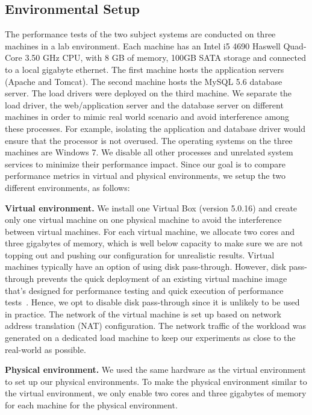 \documentclass[smallextended]{svjour3}       %
\begin{document}
\subsection{Environmental Setup}

The performance tests of the two subject systems are conducted on three machines in a lab environment. Each machine has an Intel i5 4690 Haswell Quad-Core 3.50 GHz CPU, with 8 GB of memory, 100GB SATA storage and connected to a local gigabyte ethernet. The first machine hosts the application servers (Apache and Tomcat). The second machine hosts the MySQL 5.6 database server. The load drivers were deployed on the third machine. We separate the load driver, the web/application server and the database server on different machines in order to mimic real world scenario and avoid interference among these processes. For example, isolating the application and database driver would ensure that the processor is not overused. The operating systems on the three machines are Windows 7. We disable all other processes and unrelated system services to minimize their performance impact. Since our goal is to compare performance metrics in virtual and physical environments, we setup the two different environments, as follows:


\noindent \textbf{Virtual environment.} We install one Virtual Box (version 5.0.16) and create only one virtual machine on one physical machine to avoid the interference between virtual machines. For each virtual machine, we allocate two cores and three gigabytes of memory, which is well below capacity to make sure we are not topping out and pushing our configuration for unrealistic results. Virtual machines typically have an option of using disk pass-through\cite{whatisdiskpassthrough}. However, disk pass-through prevents the quick deployment of an existing virtual machine image that's designed for performance testing and quick execution of performance tests~\cite{diskpassthrough}. Hence, we opt to disable disk pass-through since it is unlikely to be used in practice. The network of the virtual machine is set up based on network address translation (NAT) configuration\cite{NAT_config}. The network traffic of the workload was generated on a dedicated load machine to keep our experiments as close to the real-world as possible.


\noindent \textbf{Physical environment.} We used the same hardware as the virtual environment to set up our physical environments. To make the physical environment similar to the virtual environment, we only enable two cores and three gigabytes of memory for each machine for the physical environment. 
\end{document}
